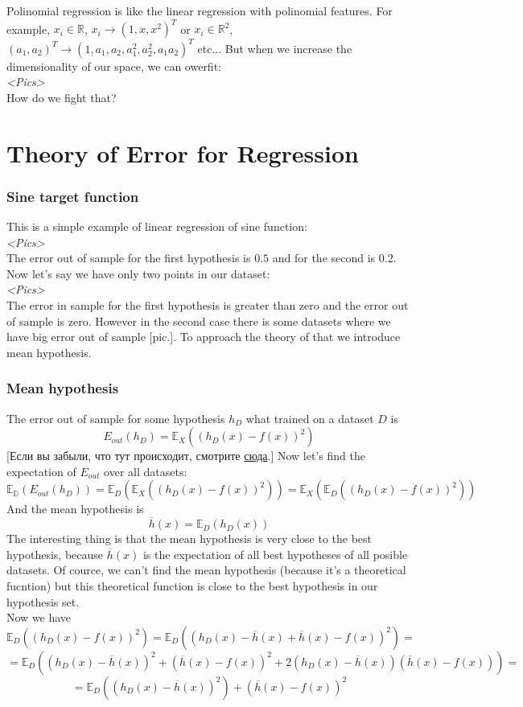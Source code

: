 Polinomial regression is like the linear regression with polinomial features. For example, $x_i\in\mathbb{R}$, $x_i\to(1,x,x^2)^T$ or $x_i\in\mathbb{R}^2$, $(a_1, a_2)^T\to(1,a_1,a_2,a_1^2,a_2^2,a_1a_2)^T$ etc... But when we increase the dimensionality of our space, we can owerfit:\\
{\it <Pics>}\\
How do we fight that?

\section{Theory of Error for Regression}
\vspace{-0.6cm}
\subsubsection*{Sine target function}

This is a simple example of linear regression of sine function:\\
{\it <Pics>}\\
The error out of sample for the first hypothesis is $0.5$ and for the second is $0.2$. Now let's say we have only two points in our dataset:\\
{\it <Pics>}\\
The error in sample for the first hypothesis is greater than zero and the error out of sample is zero. However in the second case there is some datasets where we have big error out of sample [pic.]. To approach the theory of that we introduce mean hypothesis.

\subsubsection*{Mean hypothesis}

The error out of sample for some hypothesis $h_D$ what trained on a dataset $D$ is
$$E_{out}(h_D)=\mathbb{E}_X\left(\left(h_D(x)-f(x)\right)^2\right)$$
[Если вы забыли, что тут происходит, смотрите \hyperlink{ein_and_eout}{сюда}.] Now let's find the expectation of $E_{out}$ over all datasets:
$$\mathbb{E_D}\left(E_{out}(h_D)\right)=\mathbb{E}_D\left(\mathbb{E}_X\left(\left(h_D(x)-f(x)\right)^2\right)\right)=\mathbb{E}_X\left(\mathbb{E}_D\left(\left(h_D(x)-f(x)\right)^2\right)\right)$$
And the mean hypothesis is
$$\overline{h}(x)=\mathbb{E}_D\left(h_D(x)\right)$$
The interesting thing is that the mean hypothesis is very close to the best hypothesis, because $\overline{h}(x)$ is the expectation of all best hypotheses of all posible datasets. Of cource, we can't find the mean hypothesis (because it's a theoretical fucntion) but this theoretical function is close to the best hypothesis in our hypothesis set.\\
Now we have
$$\mathbb{E}_D\left(\left(h_D(x)-f(x)\right)^2\right)=\mathbb{E}_D\left(\left(h_D(x)-\overline{h}(x)+\overline{h}(x)-f(x)\right)^2\right)=$$
$$=\mathbb{E}_D\left(\left(h_D(x)-\overline{h}(x)\right)^2+\left(\overline{h}(x)-f(x)\right)^2+2\left(h_D(x)-\overline{h}(x)\right)\left(\overline{h}(x)-f(x)\right)\right)=$$
$$=\mathbb{E}_D\left(\left(h_D(x)-\overline{h}(x)\right)^2\right)+\left(\overline{h}(x)-f(x)\right)^2$$

